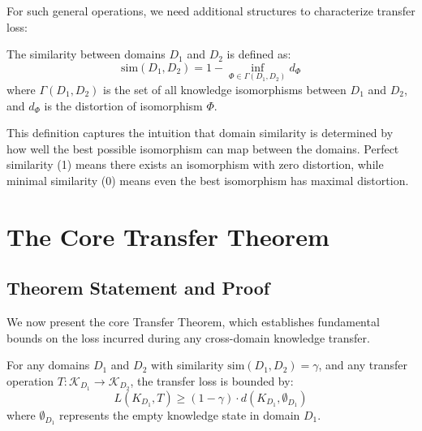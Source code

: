 For such general operations, we need additional structures to characterize transfer loss:

\begin{definition}
The similarity between domains $D_1$ and $D_2$ is defined as:
\begin{equation}
\text{sim}(D_1, D_2) = 1 - \inf_{\Phi \in \Gamma(D_1, D_2)} d_{\Phi}
\end{equation}
where $\Gamma(D_1, D_2)$ is the set of all knowledge isomorphisms between $D_1$ and $D_2$, and $d_{\Phi}$ is the distortion of isomorphism $\Phi$.
\end{definition}

This definition captures the intuition that domain similarity is determined by how well the best possible isomorphism can map between the domains. Perfect similarity (1) means there exists an isomorphism with zero distortion, while minimal similarity (0) means even the best isomorphism has maximal distortion.

\section{The Core Transfer Theorem}

\subsection{Theorem Statement and Proof}

We now present the core Transfer Theorem, which establishes fundamental bounds on the loss incurred during any cross-domain knowledge transfer.

\begin{theorem}
For any domains $D_1$ and $D_2$ with similarity $\text{sim}(D_1, D_2) = \gamma$, and any transfer operation $T: \mathcal{K}_{D_1} \to \mathcal{K}_{D_2}$, the transfer loss is bounded by:
\begin{equation}
L(K_{D_1}, T) \geq (1 - \gamma) \cdot d(K_{D_1}, \emptyset_{D_1})
\end{equation}
where $\emptyset_{D_1}$ represents the empty knowledge state in domain $D_1$.
\end{theorem}

